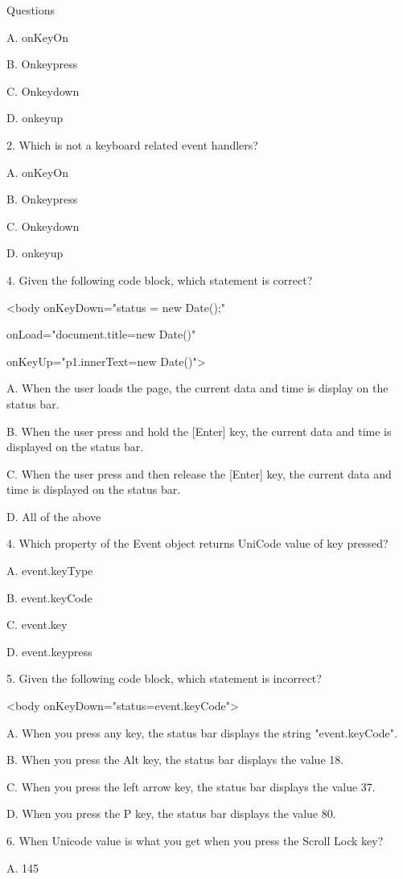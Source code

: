 \documentclass[
]{article}
\begin{document}
Questions

A. onKeyOn

B. Onkeypress

C. Onkeydown

D. onkeyup

2. Which is not a keyboard related event handlers?

A. onKeyOn

B. Onkeypress

C. Onkeydown

D. onkeyup

4. Given the following code block, which statement is correct?

\textless body onKeyDown="status = new Date();"

onLoad="document.title=new Date()"

onKeyUp="p1.innerText=new Date()"\textgreater{}

A. When the user loads the page, the current data and time is display on
the status bar.

B. When the user press and hold the {[}Enter{]} key, the current data
and time is displayed on the status bar.

C. When the user press and then release the {[}Enter{]} key, the current
data and time is displayed on the status bar.

D. All of the above

4. Which property of the Event object returns UniCode value of key
pressed?

A. event.keyType

B. event.keyCode

C. event.key

D. event.keypress

5. Given the following code block, which statement is incorrect?

\textless body onKeyDown="status=event.keyCode"\textgreater{}

A. When you press any key, the status bar displays the string
"event.keyCode".

B. When you press the Alt key, the status bar displays the value 18.

C. When you press the left arrow key, the status bar displays the value
37.

D. When you press the P key, the status bar displays the value 80.

6. When Unicode value is what you get when you press the Scroll Lock
key?

A. 145
\end{document}
